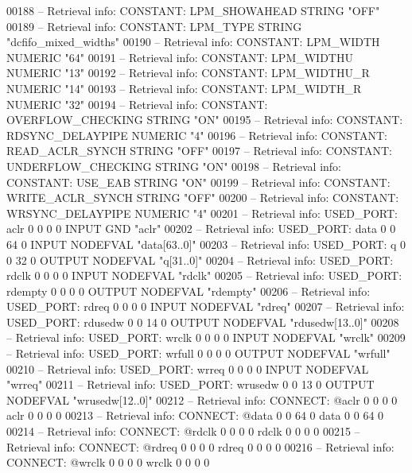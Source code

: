 \begin{DoxyCode}
{00188 \textcolor{keyword}{-- Retrieval info: CONSTANT: LPM\_SHOWAHEAD STRING "OFF"}
00189 \textcolor{keyword}{-- Retrieval info: CONSTANT: LPM\_TYPE STRING "dcfifo\_mixed\_widths"}
00190 \textcolor{keyword}{-- Retrieval info: CONSTANT: LPM\_WIDTH NUMERIC "64"}
00191 \textcolor{keyword}{-- Retrieval info: CONSTANT: LPM\_WIDTHU NUMERIC "13"}
00192 \textcolor{keyword}{-- Retrieval info: CONSTANT: LPM\_WIDTHU\_R NUMERIC "14"}
00193 \textcolor{keyword}{-- Retrieval info: CONSTANT: LPM\_WIDTH\_R NUMERIC "32"}
00194 \textcolor{keyword}{-- Retrieval info: CONSTANT: OVERFLOW\_CHECKING STRING "ON"}
00195 \textcolor{keyword}{-- Retrieval info: CONSTANT: RDSYNC\_DELAYPIPE NUMERIC "4"}
00196 \textcolor{keyword}{-- Retrieval info: CONSTANT: READ\_ACLR\_SYNCH STRING "OFF"}
00197 \textcolor{keyword}{-- Retrieval info: CONSTANT: UNDERFLOW\_CHECKING STRING "ON"}
00198 \textcolor{keyword}{-- Retrieval info: CONSTANT: USE\_EAB STRING "ON"}
00199 \textcolor{keyword}{-- Retrieval info: CONSTANT: WRITE\_ACLR\_SYNCH STRING "OFF"}
00200 \textcolor{keyword}{-- Retrieval info: CONSTANT: WRSYNC\_DELAYPIPE NUMERIC "4"}
00201 \textcolor{keyword}{-- Retrieval info: USED\_PORT: aclr 0 0 0 0 INPUT GND "aclr"}
00202 \textcolor{keyword}{-- Retrieval info: USED\_PORT: data 0 0 64 0 INPUT NODEFVAL "data[63..0]"}
00203 \textcolor{keyword}{-- Retrieval info: USED\_PORT: q 0 0 32 0 OUTPUT NODEFVAL "q[31..0]"}
00204 \textcolor{keyword}{-- Retrieval info: USED\_PORT: rdclk 0 0 0 0 INPUT NODEFVAL "rdclk"}
00205 \textcolor{keyword}{-- Retrieval info: USED\_PORT: rdempty 0 0 0 0 OUTPUT NODEFVAL "rdempty"}
00206 \textcolor{keyword}{-- Retrieval info: USED\_PORT: rdreq 0 0 0 0 INPUT NODEFVAL "rdreq"}
00207 \textcolor{keyword}{-- Retrieval info: USED\_PORT: rdusedw 0 0 14 0 OUTPUT NODEFVAL "rdusedw[13..0]"}
00208 \textcolor{keyword}{-- Retrieval info: USED\_PORT: wrclk 0 0 0 0 INPUT NODEFVAL "wrclk"}
00209 \textcolor{keyword}{-- Retrieval info: USED\_PORT: wrfull 0 0 0 0 OUTPUT NODEFVAL "wrfull"}
00210 \textcolor{keyword}{-- Retrieval info: USED\_PORT: wrreq 0 0 0 0 INPUT NODEFVAL "wrreq"}
00211 \textcolor{keyword}{-- Retrieval info: USED\_PORT: wrusedw 0 0 13 0 OUTPUT NODEFVAL "wrusedw[12..0]"}
00212 \textcolor{keyword}{-- Retrieval info: CONNECT: @aclr 0 0 0 0 aclr 0 0 0 0}
00213 \textcolor{keyword}{-- Retrieval info: CONNECT: @data 0 0 64 0 data 0 0 64 0}
00214 \textcolor{keyword}{-- Retrieval info: CONNECT: @rdclk 0 0 0 0 rdclk 0 0 0 0}
00215 \textcolor{keyword}{-- Retrieval info: CONNECT: @rdreq 0 0 0 0 rdreq 0 0 0 0}
00216 \textcolor{keyword}{-- Retrieval info: CONNECT: @wrclk 0 0 0 0 wrclk 0 0 0 0}
}
\end{DoxyCode}
